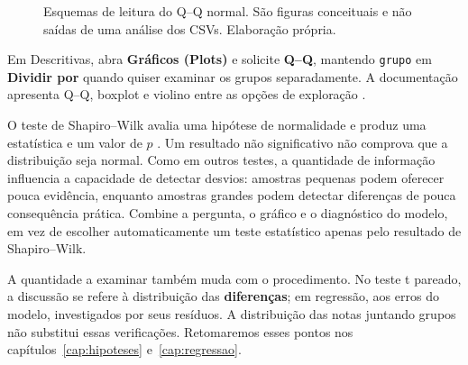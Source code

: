 \begin{figure}[H]
\centering
{}
\caption{Esquemas de leitura do Q--Q normal. São figuras conceituais e não saídas de uma análise dos CSVs. Elaboração própria.}
\label{fig:qq-esquemas}
\end{figure}

Em Descritivas, abra \textbf{Gráficos (Plots)} e solicite \textbf{Q--Q}, mantendo \texttt{grupo} em \textbf{Dividir por} quando quiser examinar os grupos separadamente. A documentação apresenta Q--Q, boxplot e violino entre as opções de exploração \parencite{JamoviGuiaDescritivas}.

O teste de Shapiro--Wilk avalia uma hipótese de normalidade e produz uma estatística e um valor de $p$ \parencite{RShapiro}. Um resultado não significativo não comprova que a distribuição seja normal. Como em outros testes, a quantidade de informação influencia a capacidade de detectar desvios: amostras pequenas podem oferecer pouca evidência, enquanto amostras grandes podem detectar diferenças de pouca consequência prática. Combine a pergunta, o gráfico e o diagnóstico do modelo, em vez de escolher automaticamente um teste estatístico apenas pelo resultado de Shapiro--Wilk.

A quantidade a examinar também muda com o procedimento. No teste t pareado, a discussão se refere à distribuição das \textbf{diferenças}; em regressão, aos erros do modelo, investigados por seus resíduos. A distribuição das notas juntando grupos não substitui essas verificações. Retomaremos esses pontos nos capítulos~\ref{cap:hipoteses} e~\ref{cap:regressao}.

